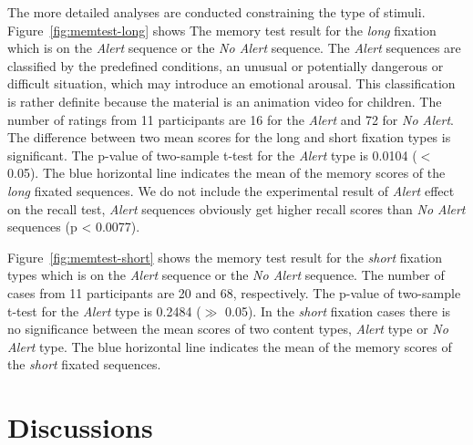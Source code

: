 \documentclass[10pt,letterpaper]{article}
\begin{document}
The more detailed analyses are conducted constraining the type of stimuli.
Figure~\ref{fig:memtest-long} shows The memory test result for the \textit{long} fixation which is on the \textit{Alert} sequence or the \textit{No Alert} sequence. The \textit{Alert} sequences are classified by the predefined conditions, an unusual or potentially dangerous or difficult situation, which may introduce an emotional arousal. This classification is rather definite because the material is an animation video for children. The number of ratings from 11 participants are 16 for the \textit{Alert} and 72 for \textit{No Alert}. The difference between two mean scores for the long and short fixation types is significant. The p-value of two-sample t-test for the \textit{Alert} type is 0.0104 ($<$ 0.05). The blue horizontal line indicates the mean of the memory scores of the \textit{long} fixated sequences. We do not include the experimental result of \textit{Alert} effect on the recall test, \textit{Alert} sequences obviously get higher recall scores than \textit{No Alert} sequences (p < 0.0077).

Figure~\ref{fig:memtest-short} shows the memory test result for the \textit{short} fixation types which is on the \textit{Alert} sequence or the \textit{No Alert} sequence. The number of cases from 11 participants are 20 and 68, respectively. The p-value of two-sample t-test for the \textit{Alert} type is 0.2484 ($\gg$ 0.05). In the \textit{short} fixation cases there is no significance between the mean scores of two content types, \textit{Alert} type or \textit{No Alert} type. The blue horizontal line indicates the mean of the memory scores of the \textit{short} fixated sequences.

\section{Discussions}
\end{document}
